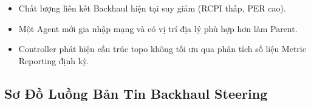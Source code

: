 \begin{itemize}
	\item Chất lượng liên kết Backhaul hiện tại suy giảm (RCPI thấp, PER cao).
	\item Một Agent mới gia nhập mạng và có vị trí địa lý phù hợp hơn làm Parent.
	\item Controller phát hiện cấu trúc topo không tối ưu qua phân tích số liệu
	Metric Reporting định kỳ.
\end{itemize}


\subsection{Sơ Đồ Luồng Bản Tin Backhaul Steering}

